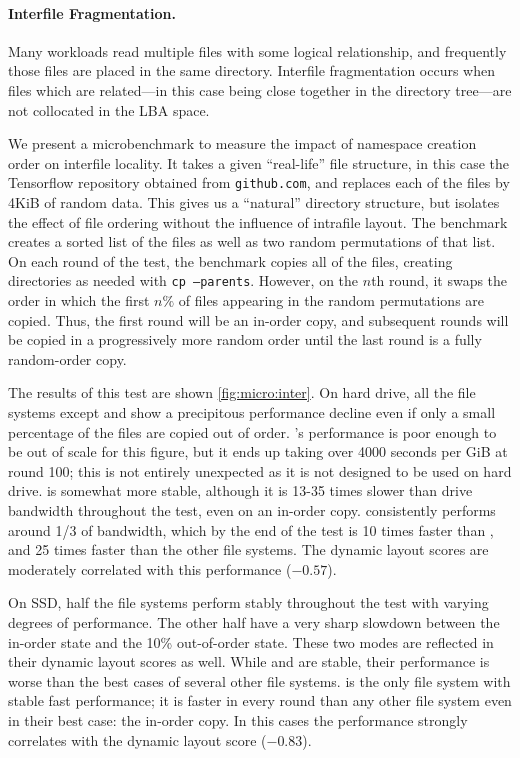 \paragraph{Interfile Fragmentation.}\label{sec:interfile} Many workloads read
multiple files with some logical relationship, and frequently those files are
placed in the same directory. Interfile fragmentation occurs when files which
are related---in this case being close together in the directory tree---are not
collocated in the LBA space.

We present a microbenchmark to measure the impact of namespace creation order
on interfile locality. It takes a given ``real-life'' file structure, in this
case the Tensorflow repository obtained from \texttt{github.com}, and replaces
each of the files by 4KiB of random data. This gives us a ``natural'' directory
structure, but isolates the effect of file ordering without the influence of
intrafile layout. The benchmark creates a sorted list of the files as well as
two random permutations of that list. On each round of the test, the benchmark
copies all of the files, creating directories as needed with {\tt cp
--parents}.  However, on the $n$th round, it swaps the order in which the first
$n\%$ of files appearing in the random permutations are copied. Thus, the first
round will be an in-order copy, and subsequent rounds will be copied in a
progressively more random order until the last round is a fully random-order
copy.

The results of this test are shown \cref{fig:micro:inter}.  On hard
drive, all the file systems except \betrfs and \xfs show a precipitous
performance decline even if only a small percentage of the files are copied out
of order. \ftwofs's performance is poor enough to be out of scale for this
figure, but it ends up taking over 4000 seconds per GiB at round 100; this is
not entirely unexpected as it is not designed to be used on hard drive. \xfs is
somewhat more stable, although it is 13-35 times slower than drive bandwidth
throughout the test, even on an in-order copy.  \betrfs consistently performs
around 1/3 of bandwidth, which by the end of the test is 10 times faster than
\xfs, and 25 times faster than the other file systems. The dynamic layout
scores are moderately correlated with this performance ($-0.57$).

On SSD, half the file systems perform stably throughout the test with varying
degrees of performance. The other half have a very sharp slowdown between the
in-order state and the 10\% out-of-order state. These two modes are reflected
in their dynamic layout scores as well. While \ext and \zfs are stable, their
performance is worse than the best cases of several other file systems.
\betrfs is the only file system with stable fast performance; it is faster in
every round than any other file system even in their best case: the in-order
copy. In this cases the performance strongly correlates with the dynamic layout
score ($-0.83$).
